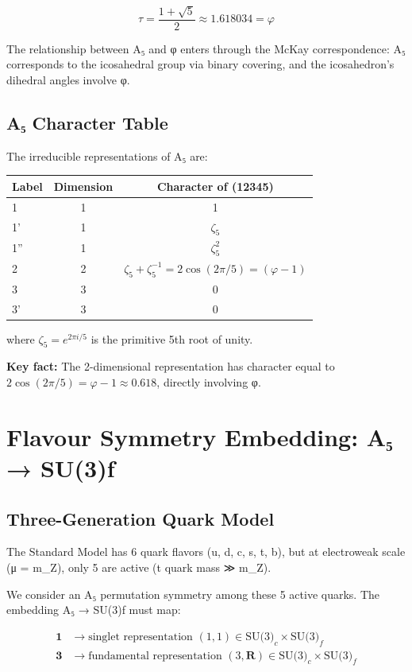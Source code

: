 \documentclass{article}
\begin{document}
\[
\tau = \frac{1+\sqrt{5}}{2} \approx 1.618034 = \varphi
\]

The relationship between A₅ and φ enters through the McKay correspondence: A₅ corresponds to the icosahedral group via binary covering, and the icosahedron's dihedral angles involve φ.

\subsection{A₅ Character Table}

The irreducible representations of A₅ are:

\begin{table}[h]
\centering
\begin{tabular}{lcc}
\toprule
Label & Dimension & Character of (12345) \\
\midrule
1 & 1 & 1 \\
1' & 1 & $\zeta_5$ \\
1'' & 1 & $\zeta_5^2$ \\
2 & 2 & $\zeta_5 + \zeta_5^{-1} = 2\cos(2\pi/5) = (\varphi - 1)$ \\
3 & 3 & 0 \\
3' & 3 & 0 \\
\bottomrule
\end{tabular}
\end{table}

where $\zeta_5 = e^{2\pi i/5}$ is the primitive 5th root of unity.

\textbf{Key fact:} The 2-dimensional representation has character equal to $2\cos(2\pi/5) = \varphi - 1 \approx 0.618$, directly involving φ.

\section{Flavour Symmetry Embedding: A₅ → SU(3)f}

\subsection{Three-Generation Quark Model}

The Standard Model has 6 quark flavors (u, d, c, s, t, b), but at electroweak scale (μ = m_Z), only 5 are active (t quark mass ≫ m_Z).

We consider an A₅ permutation symmetry among these 5 active quarks. The embedding A₅ → SU(3)f must map:

\[
\begin{aligned}
\mathbf{1} &\to \text{singlet representation } (1, 1) \in \text{SU(3)}_c \times \text{SU(3)}_f \\
\mathbf{3} &\to \text{fundamental representation } (3, \mathbf{R}) \in \text{SU(3)}_c \times \text{SU(3)}_f \\
\end{aligned}
\]
\end{document}
